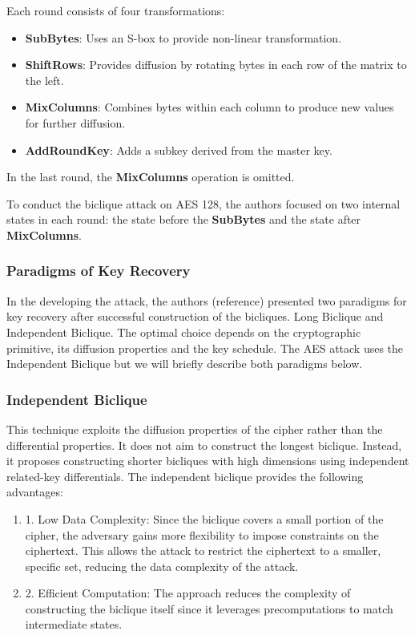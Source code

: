 \documentclass{report}
\begin{document}
Each round consists of four transformations:
\begin{itemize}
    \item \textbf{SubBytes}: Uses an S-box to provide non-linear transformation.
    \item \textbf{ShiftRows}: Provides diffusion by rotating bytes in each row of the matrix to the left.
    \item \textbf{MixColumns}: Combines bytes within each column to produce new values for further diffusion.
    \item \textbf{AddRoundKey}: Adds a subkey derived from the master key.
\end{itemize}

In the last round, the \textbf{MixColumns} operation is omitted.

To conduct the biclique attack on AES 128, the authors \cite{bogdanov2011biclique} focused on two internal states in each round: the state before the \textbf{SubBytes} and the state after \textbf{MixColumns}.

 \subsubsection{Paradigms of Key Recovery}
 In the developing the attack, the authors (reference) presented two paradigms for key recovery after successful construction of the bicliques. Long Biclique and Independent Biclique. The optimal choice depends on the cryptographic primitive, its diffusion properties and the key schedule. The AES attack uses the Independent Biclique but we will briefly describe both paradigms below.
 \subsubsection{Independent Biclique}
 This technique exploits the diffusion properties of the cipher rather than the differential properties. It does not aim to construct the longest biclique. Instead, it proposes constructing shorter bicliques with high dimensions using independent related-key differentials. The independent biclique provides the following advantages:
 \begin{enumerate}
    \item 1.	Low Data Complexity: Since the biclique covers a small portion of the cipher, the adversary gains more flexibility to impose constraints on the ciphertext. This allows the attack to restrict the ciphertext to a smaller, specific set, reducing the data complexity of the attack.
    \item 2.	Efficient Computation: The approach reduces the complexity of constructing the biclique itself since it leverages precomputations to match intermediate states.
 \end{enumerate}
\end{document}

